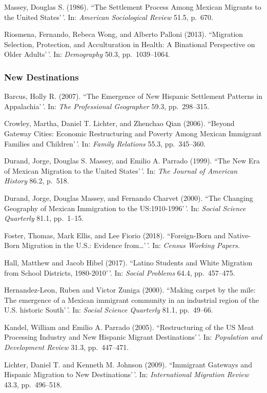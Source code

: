 \documentclass[11pt,]{article}
\begin{document}
Massey, Douglas S. (1986). ``The Settlement Process Among Mexican
Migrants to the United States'\,'. In:
\emph{American Sociological Review} 51.5, p.~670.

Riosmena, Fernando, Rebeca Wong, and Alberto Palloni (2013). ``Migration
Selection, Protection, and Acculturation in Health: A Binational
Perspective on Older Adults'\,'. In: \emph{Demography} 50.3,
pp.~1039--1064.

\hypertarget{new-destinations}{%
\subsubsection{New Destinations}\label{new-destinations}}

Barcus, Holly R. (2007). ``The Emergence of New Hispanic Settlement
Patterns in Appalachia'\,'. In: \emph{The Professional Geographer} 59.3,
pp.~298--315.

Crowley, Martha, Daniel T. Lichter, and Zhenchao Qian (2006). ``Beyond
Gateway Cities: Economic Restructuring and Poverty Among Mexican
Immigrant Families and Children'\,'. In: \emph{Family Relations} 55.3,
pp.~345--360.

Durand, Jorge, Douglas S. Massey, and Emilio A. Parrado (1999). ``The
New Era of Mexican Migration to the United States'\,'. In:
\emph{The Journal of American History} 86.2, p.~518.

Durand, Jorge, Douglas Massey, and Fernando Charvet (2000). ``The
Changing Geography of Mexican Immigration to the US:1910-1996'\,'. In:
\emph{Social Science Quarterly} 81.1, pp.~1--15.

Foster, Thomas, Mark Ellis, and Lee Fiorio (2018). ``Foreign-Born and
Native-Born Migration in the U.S.: Evidence from\ldots'\,'. In:
\emph{Census Working Papers}.

Hall, Matthew and Jacob Hibel (2017). ``Latino Students and White
Migration from School Districts, 1980-2010'\,'. In:
\emph{Social Problems} 64.4, pp.~457--475.

Hernandez-Leon, Ruben and Victor Zuniga (2000). ``Making carpet by the
mile: The emergence of a Mexican immigrant community in an industrial
region of the U.S. historic South'\,'. In:
\emph{Social Science Quarterly} 81.1, pp.~49--66.

Kandel, William and Emilio A. Parrado (2005). ``Restructuring of the US
Meat Processing Industry and New Hispanic Migrant Destinations'\,'. In:
\emph{Population and Development Review} 31.3, pp.~447--471.

Lichter, Daniel T. and Kenneth M. Johnson (2009). ``Immigrant Gateways
and Hispanic Migration to New Destinations'\,'. In:
\emph{International Migration Review} 43.3, pp.~496--518.
\end{document}
